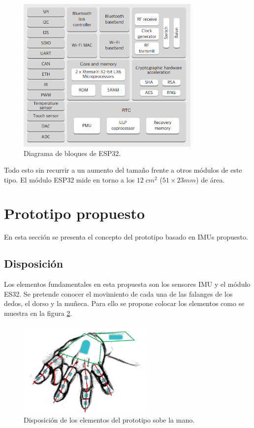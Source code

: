 	\begin{figure}[H]
		\centering
		\includegraphics[width=0.8\textwidth]{./img/esp32diagrama}
		\caption{Diagrama de bloques de ESP32. } 
		\label{fig:esp32tabla}
	\end{figure} 

Todo esto sin recurrir a un aumento del tamaño frente a otros módulos de este tipo. El módulo ESP32 mide en torno a los $12\;cm^{2}$ ($ 51 \times 23 mm $) de área.


\section{Prototipo propuesto}
\label{sec:prototipo4}

En esta sección se presenta el concepto del prototipo basado en IMUs propuesto.

\subsection{Disposición}
\label{sec:materiales4}

Los elementos fundamentales en esta propuesta son los sensores IMU y el módulo ES32. Se pretende conocer el movimiento de cada una de las falanges de los dedos, el dorso y la muñeca. Para ello se propone colocar los elementos como se muestra en la figura \ref{fig:disposicionIMU}. 


\begin{figure}[H]
	\centering
	\includegraphics[width=0.6\textwidth]{./img/IMU2}
	\caption{Disposición de los elementos del prototipo sobe la mano. } 
	\label{fig:disposicionIMU}
\end{figure} 


